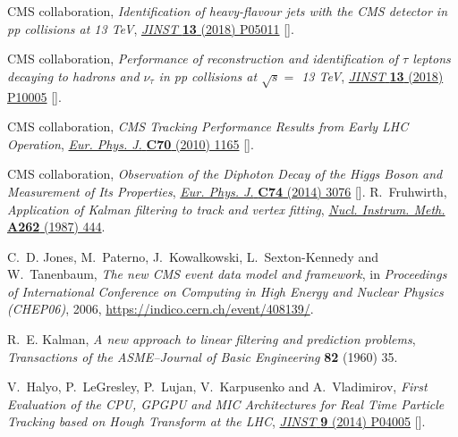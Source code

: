 \documentclass[a4paper,11pt]{article}
\begin{document}
\begin{thebibliography}{10}
{\scshape CMS} collaboration, \emph{{Identification of heavy-flavour jets with
  the CMS detector in pp collisions at 13 TeV}},
  \href{https://doi.org/10.1088/1748-0221/13/05/P05011}{\emph{JINST} {\bfseries
  13} (2018) P05011} [\href{https://arxiv.org/abs/1712.07158}{{}}].

{\scshape CMS} collaboration, \emph{{Performance of reconstruction and
  identification of $\tau$ leptons decaying to hadrons and $\nu_\tau$ in pp
  collisions at $\sqrt{s}=$ 13 TeV}},
  \href{https://doi.org/10.1088/1748-0221/13/10/P10005}{\emph{JINST} {\bfseries
  13} (2018) P10005} [\href{https://arxiv.org/abs/1809.02816}{{}}].

{\scshape CMS} collaboration, \emph{{CMS Tracking Performance Results from
  Early LHC Operation}},
  \href{https://doi.org/10.1140/epjc/s10052-010-1491-3}{\emph{Eur. Phys. J.}
  {\bfseries C70} (2010) 1165}
  [\href{https://arxiv.org/abs/1007.1988}{{}}].

{\scshape CMS} collaboration, \emph{{Observation of the Diphoton Decay of the
  Higgs Boson and Measurement of Its Properties}},
  \href{https://doi.org/10.1140/epjc/s10052-014-3076-z}{\emph{Eur. Phys. J.}
  {\bfseries C74} (2014) 3076}
  [\href{https://arxiv.org/abs/1407.0558}{{}}].
R.~Fruhwirth, \emph{{Application of Kalman filtering to track and vertex
  fitting}}, \href{https://doi.org/10.1016/0168-9002(87)90887-4}{\emph{Nucl.
  Instrum. Meth.} {\bfseries A262} (1987) 444}.

C.~D. Jones, M.~Paterno, J.~Kowalkowski, L.~Sexton-Kennedy and W.~Tanenbaum,
  \emph{The new {CMS} event data model and framework},  in \emph{Proceedings of
  International Conference on Computing in High Energy and Nuclear Physics
  (CHEP06)}, 2006,
  \href{https://indico.cern.ch/event/408139/}{https://indico.cern.ch/event/408139/}.

R.~E. Kalman, \emph{A new approach to linear filtering and prediction
  problems}, {\emph{Transactions of the ASME--Journal of Basic Engineering}
  {\bfseries 82} (1960) 35}.

V.~Halyo, P.~LeGresley, P.~Lujan, V.~Karpusenko and A.~Vladimirov, \emph{{First
  Evaluation of the CPU, GPGPU and MIC Architectures for Real Time Particle
  Tracking based on Hough Transform at the LHC}},
  \href{https://doi.org/10.1088/1748-0221/9/04/P04005}{\emph{JINST} {\bfseries
  9} (2014) P04005} [\href{https://arxiv.org/abs/1310.7556}{{}}].


\end{thebibliography}
\end{document}
